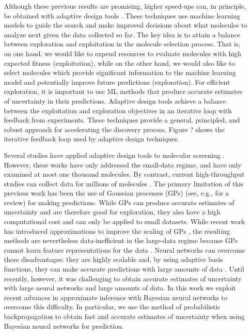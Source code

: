 Although these previous results are promising, higher speed-ups can, in principle, be obtained with adaptive design tools \cite{jones1998efficient}. These techniques use machine learning models to guide the search and make improved decisions about what molecules to analyze next given the data collected so far. The key idea is to attain a balance between exploration and exploitation in the molecule selection process.  That is, on one hand, we would like to expend resources to evaluate molecules with high expected fitness (exploitation), while on the other hand, we would also like to select molecules which provide significant information to the machine learning model and potentially improve future predictions (exploration). For efficient exploration, it is important to use ML methods that produce accurate estimates of uncertainty in their predictions.  Adaptive design tools achieve a balance between the exploitation and exploration objectives in an iterative loop with feedback from experiments.  These techniques provide a general, principled, and robust approach for accelerating the discovery process.  Figure ? shows the iterative feedback loop used by adaptive design techniques.

Several studies have applied adaptive design tools to molecular screening \cite{Xue_2016,Seko_2015,Negoescu_2011,De_Grave_2008}.  However, these works have only addressed the small-data regime, and have only examined at most one thousand molecules. By contrast, current high-throughput studies can collect data for millions of molecules \cite{Hachmann_2011}.  The primary limitation of this previous work has been the use of Gaussian processes (GPs) (see, e.g., \cite{rasmussen2006gaussian} for a review) for making predictions. While GPs can produce accurate estimates of uncertainty and are therefore good for exploration, they also have a high computational cost and can only be applied to small datasets.  While recent work has introduced approximations to improve the scaling of GPs \cite{snelson2005sparse,hensman2015scalable}, the resulting methods are
nevertheless data-inefficient in the large-data regime because GPs cannot learn feature representations for the data \cite{bengio2007scaling}. Neural networks can overcome these disadvantages: they are highly scalable and, by using adaptive basis functions, they can make accurate predictions with large amounts of data \cite{lecun2015deep}. Until recently, however, it was challenging to obtain accurate estimates of uncertainty with large neural networks and large amounts of data. In this work we exploit recent advances in approximate inference with Bayesian neural networks to overcome this difficulty. In particular, we use the method of probabilistic backpropagation \cite{Hernandez-Lobato15b} to obtain fast and accurate estimates of uncertainty when using Bayesian neural networks for prediction.

